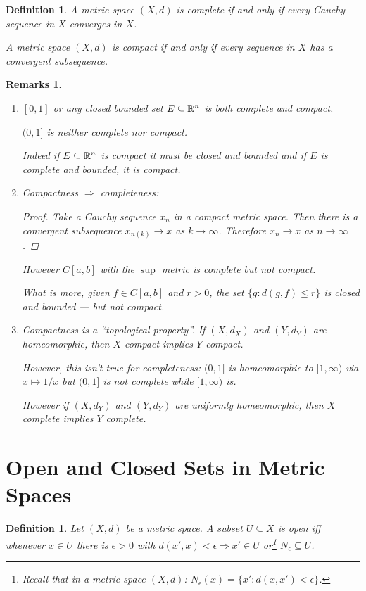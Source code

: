 \documentclass{notes}
\theoremstyle{plain}
\newtheorem{definition}[proposition]{Definition}
\newtheorem*{remarks}{Remarks}
\begin{document}
\begin{definition}
A metric space $ (X,d) $ is \emph{complete} if and only if every 
Cauchy sequence in $ X $ converges in $ X $.

A metric space $ (X,d) $ is \emph{compact} if and only if every 
sequence in $ X $ has a convergent subsequence.
\end{definition}

\begin{remarks}
\

\begin{enumerate}
\item
$ [0,1] $ or any closed bounded set $ E \subseteq \mathbb{R}^{n} $ is both 
complete and compact.

$ (0,1] $ is neither complete nor compact.

Indeed if $ E \subseteq \mathbb{R}^{n} $ is compact it must be closed and 
bounded and if $ E $ is complete and bounded, it is compact.

\item
Compactness $ \Rightarrow $ completeness:
\begin{proof}
Take a Cauchy sequence $ x_{n} $ in a compact metric space.
Then there is a convergent subsequence $ x_{n(k)} \to x $ 
as $ k \to \infty $. Therefore $ x_{n} \to x $ as $ n \to \infty $.
\end{proof}

However $ C[a,b] $ with the $ \sup $ metric is complete but not 
compact.

What is more, given $ f\in C[a,b] $ and $r > 0$, the set
$\{ g: d(g,f) \leq r \}$
is closed and bounded --- but not compact.

\item
Compactness is a ``topological property''. If $ (X,d_{X}) $ and $ 
(Y,d_{Y}) $ are homeomorphic, then $ X $ compact implies $ Y  $ 
compact.

However, this isn't true for completeness:
$ (0,1] $ is homeomorphic to $ [1,\infty) $ via $ x \mapsto 1/x $ 
but $ (0,1] $ is not complete while $ [1,\infty) $ is.

However if $ (X,d_{Y}) $ and $ (Y,d_{Y}) $ are uniformly 
homeomorphic, then $ X $ complete implies $ Y $ complete.
\end{enumerate}
\end{remarks}

\section{Open and Closed Sets in Metric Spaces}
\begin{definition}
Let $ (X,d) $ be a metric space.
A subset $ U\subseteq X $ is open iff whenever $ x \in U $ there 
is $ \epsilon>0 $ with
$d(x',x)<\epsilon \Rightarrow x' \in U$
or\footnote{Recall that in a metric space $ (X,d) $:
$N_{\epsilon}(x)=\{ x':d(x,x')<\epsilon \}$.}
$N_{\epsilon} \subseteq U$.
\end{definition}
\end{document}
